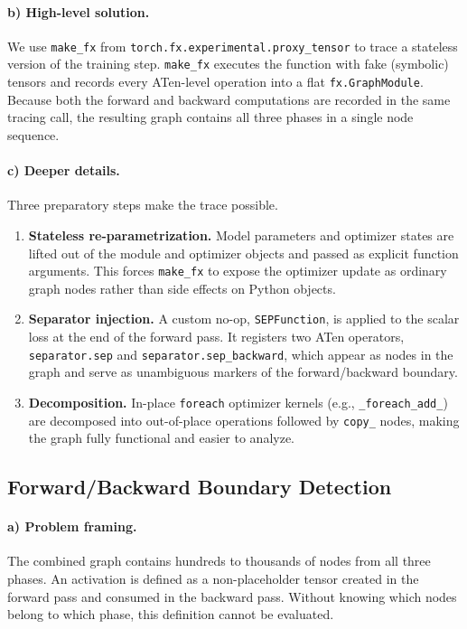 \documentclass[11pt]{article}
\begin{document}
\paragraph{b) High-level solution.}
We use \texttt{make\_fx} from \texttt{torch.fx.experimental.proxy\_tensor}
to trace a stateless version of the training step.
\texttt{make\_fx} executes the function with fake (symbolic) tensors and
records every ATen-level operation into a flat \texttt{fx.GraphModule}.
Because both the forward and backward computations are recorded in the
same tracing call, the resulting graph contains all three phases in a
single node sequence.

\paragraph{c) Deeper details.}
Three preparatory steps make the trace possible.
\begin{enumerate}
  \item \textbf{Stateless re-parametrization.}
    Model parameters and optimizer states are lifted out of the module
    and optimizer objects and passed as explicit function arguments.
    This forces \texttt{make\_fx} to expose the optimizer update as
    ordinary graph nodes rather than side effects on Python objects.
  \item \textbf{Separator injection.}
    A custom no-op, \texttt{SEPFunction}, is applied to the scalar loss
    at the end of the forward pass.
    It registers two ATen operators, \texttt{separator.sep} and
    \texttt{separator.sep\_backward}, which appear as nodes in the graph
    and serve as unambiguous markers of the forward/backward boundary.
  \item \textbf{Decomposition.}
    In-place \texttt{foreach} optimizer kernels (e.g.,
    \texttt{\_foreach\_add\_}) are decomposed into out-of-place
    operations followed by \texttt{copy\_} nodes, making the graph
    fully functional and easier to analyze.
\end{enumerate}

\subsection{Forward/Backward Boundary Detection}

\paragraph{a) Problem framing.}
The combined graph contains hundreds to thousands of nodes from all
three phases.
An activation is defined as a non-placeholder tensor created in the
forward pass and consumed in the backward pass.
Without knowing which nodes belong to which phase, this definition
cannot be evaluated.
\end{document}
